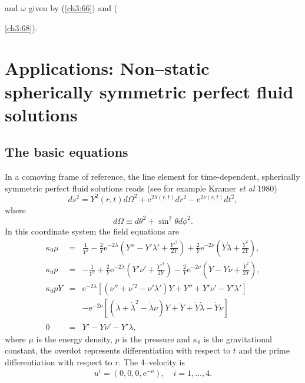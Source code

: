 and $\omega$ given by (\ref{ch3:66}) and ({\ref{ch3:68}). 

\section{Applications: Non--static spherically
symmetric perfect fluid solutions} 

\subsection{The basic equations}
In a comoving frame of reference, the line element for time-dependent,
spherically symmetric perfect fluid solutions reads
(see for example Kramer {\em et al} 1980)
\begin{equation} ds^2=Y^2(r,t)d\Omega^2+\mbox{e}^{2\lambda
(r,t)}dr^2-\mbox{e}^{2\nu (r,t)}dt^2, \label{ch3:b1} \end{equation} where
\begin{equation} d\Omega \equiv d\theta^2+\sin^2 \theta d\phi^2.
\label{ch3:b2} \end{equation} In this coordinate system the field equations
are
\begin{eqnarray} \kappa_0\mu &=
&\frac{1}{Y^2}-\frac{2}{Y}\mbox{e}^{-2\lambda} \left ( Y''-Y'\lambda'
+\frac{Y'^2}{2Y} \right )+\frac{2}{Y}\mbox{e}^{-2\nu}\left (\dot Y \dot
\lambda +\frac{\dot Y^2}{2Y} \right ), \label{ch3:b3}\\ \kappa_0p &=
&-\frac{1}{Y^2}+\frac{2}{Y}\mbox{e}^{-2\lambda} \left ( Y'\nu'
+\frac{Y'^2}{2Y} \right )-\frac{2}{Y}\mbox{e}^{-2\nu} \left (\ddot Y
-\dot Y\dot \nu +\frac{{\dot Y}^2}{2Y} \right ), \label{ch3:b4}\\ \kappa_0 p Y
&= &\mbox{e}^{-2\lambda}[(\nu ''+\nu^{'2}-\nu '\lambda ')Y+Y''+Y' \nu'
-Y'\lambda '] \nonumber\\
 & &-\mbox{e}^{-2\nu}[(\ddot \lambda+\dot \lambda^2-\dot \lambda  \dot
 \nu)Y+ \ddot Y+ \dot Y \dot \lambda -\dot Y \dot \nu] \label{ch3:b5}\\
0 &=& \dot Y'-\dot Y\nu '-Y'\dot \lambda, \label{ch3:b6}
\end{eqnarray}
where $\mu$ is the energy density, $p$ is the pressure and $\kappa_0$ is
the gravitational constant, the overdot represents differentiation with
respect to $t$ and the prime  differentiation with respect to $r$. The
4--velocity is  \[u^i=(0,0,0,\mbox{e}^{-\nu}),\quad i=1,\ldots,4.\]

}
